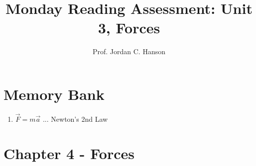 \documentclass{article}
\begin{document}
\title{Monday Reading Assessment: Unit 3, Forces}
\author{Prof. Jordan C. Hanson}

\maketitle

\section{Memory Bank}

\begin{enumerate}
\item $\vec{F} = m \vec{a}$ ... Newton's 2nd Law
\end{enumerate}

\section{Chapter 4 - Forces}
\end{document}
